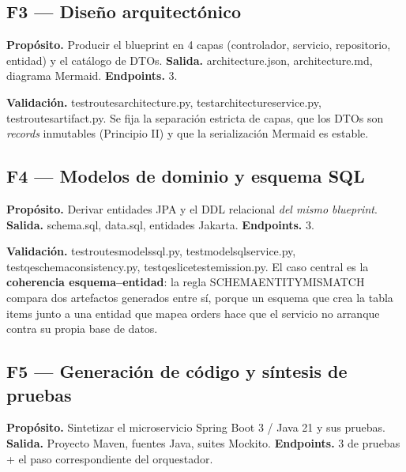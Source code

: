 \documentclass[11pt,a4paper]{article}
\newcommand{\code}[1]{{\ttfamily\small\def\_{\textunderscore\allowbreak}#1}}
\begin{document}
\subsection{F3 --- Diseño arquitectónico}

\begin{finding}
\textbf{Propósito.} Producir el blueprint en 4 capas (controlador, servicio, repositorio,
entidad) y el catálogo de DTOs. \textbf{Salida.} \code{architecture.json},
\code{architecture.md}, diagrama Mermaid. \textbf{Endpoints.} 3.
\end{finding}

\noindent\textbf{Validación.} \code{test\_routes\_architecture.py},
\code{test\_architecture\_service.py}, \code{test\_routes\_artifact.py}. Se fija la separación
estricta de capas, que los DTOs son \emph{records} inmutables (Principio II) y que la
serialización Mermaid es estable.

\subsection{F4 --- Modelos de dominio y esquema SQL}

\begin{finding}
\textbf{Propósito.} Derivar entidades JPA y el DDL relacional \emph{del mismo blueprint}.
\textbf{Salida.} \code{schema.sql}, \code{data.sql}, entidades Jakarta.
\textbf{Endpoints.} 3.
\end{finding}

\noindent\textbf{Validación.} \code{test\_routes\_models\_sql.py},
\code{test\_model\_sql\_service.py}, \code{test\_qe\_schema\_consistency.py},
\code{test\_qe\_slice\_test\_emission.py}. El caso central es la \textbf{coherencia
esquema--entidad}: la regla \code{SCHEMA\_ENTITY\_MISMATCH} compara dos artefactos generados
entre sí, porque un esquema que crea la tabla \code{items} junto a una entidad que mapea
\code{orders} hace que el servicio no arranque contra su propia base de datos.

\subsection{F5 --- Generación de código y síntesis de pruebas}

\begin{finding}
\textbf{Propósito.} Sintetizar el microservicio Spring Boot 3 / Java 21 y sus pruebas.
\textbf{Salida.} Proyecto Maven, fuentes Java, suites Mockito.
\textbf{Endpoints.} 3 de pruebas + el paso correspondiente del orquestador.
\end{finding}
\end{document}
